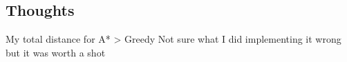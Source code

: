 \documentclass[11pt]{article}
\begin{document}
    \subsection{Thoughts}\label{thoughts}

My total distance for A* \textgreater{} Greedy Not sure what I did
implementing it wrong but it was worth a shot


    
    
    
    
\end{document}
